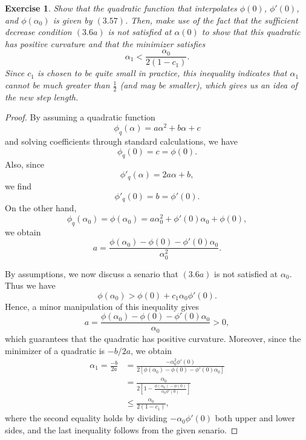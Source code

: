 \documentclass[11pt,a4paper]{article}
\renewcommand{\(}{\left(}
\renewcommand{\)}{\right)}
\newtheorem{exercise}{Exercise}
\begin{document}
  \setcounter{exercise}{12}  
  \begin{exercise}
  	Show that the quadratic function that interpolates $\phi(0)$, $\phi'(0)$, and $\phi(\alpha_0)$ is given by $(3.57)$. Then, make use of the fact that the sufficient decrease condition $(3.6a)$ is not satisfied at $\alpha (0)$ to show that this quadratic has positive curvature and that the minimizer satisfies $$\alpha_1 < \frac{\alpha_0}{2(1-c_1)}.$$ Since $c_1$ is chosen to be quite small in practice, this inequality indicates that $\alpha_1$ cannot be much greater than $\frac{1}{2}$ (and may be smaller), which gives us an idea of the new step length.
  \end{exercise}  
  \begin{proof}
  	By assuming a quadratic function $$\phi_q(\alpha) = a\alpha^2+b\alpha+c$$ and solving coefficients through standard calculations, we have 
  	$$
  	\phi_q(0) = c = \phi(0).
  	$$
  	Also, since 
  	$$
  	\phi'_q(\alpha) = 2a\alpha+b,
  	$$
  	we find
  	$$
  	\phi'_q(0) = b = \phi'(0).
  	$$
  	On the other hand,
  	$$
  	\phi_q(\alpha_0) = \phi(\alpha_0) = a\alpha_0^2+\phi'(0)\alpha_0+\phi(0),
  	$$
  	we obtain
  	$$
  	a = \frac{\phi(\alpha_0)-\phi(0)-\phi'(0)\alpha_0}{\alpha_0^2}.
  	$$
  	
  	By assumptions, we now discuss a senario that $(3.6a)$ is not satisfied at $\alpha_0$. Thus we have 
  	$$
  	\phi(\alpha_0)>\phi(0)+c_1\alpha_0\phi'(0).
  	$$
  	Hence, a minor manipulation of this inequality gives
  	$$
  	a = \frac{\phi(\alpha_0)-\phi(0)-\phi'(0)\alpha_0}{\alpha_0}>0,
  	$$ 
  	which guarantees that the quadratic has positive curvature. Moreover, since the minimizer of a quadratic is $-b/2a$, we obtain 
  	\begin{align*}
	  	\alpha_1 = \frac{-b}{2a} &= \frac{-\alpha_0^2\phi'(0)}{2[\phi(\alpha_0)-\phi(0)-\phi'(0)\alpha_0]}\\
	  	&= \frac{\alpha_0}{2[1-\frac{\phi(\alpha_0)-\phi(0)}{\alpha_0\phi'(0)}]}\\
	  	&\le \frac{\alpha_0}{2(1-c_1)},
  	\end{align*}
  	where the second equality holds by dividing $-\alpha_0\phi'(0)$ both upper and lower sides, and the last inequality follows from the given senario. 
  	
  	
  \end{proof}      
  
\end{document}
